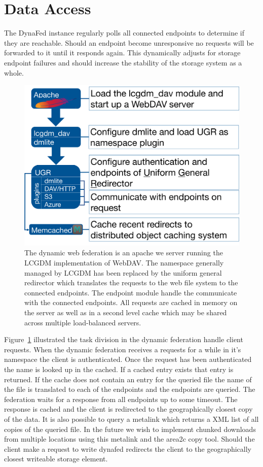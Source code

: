 \documentclass[a4paper]{jpconf}
\begin{document}
\section{Data Access}
The DynaFed instance regularly polls all connected endpoints to determine if they are reachable. Should an endpoint become unresponsive no requests will be forwarded to it until it responds again. This dynamically adjusts for storage endpoint failures and should increase the stability of the storage system as a whole.

\begin{figure}
  \centering
  \includegraphics[width=\textwidth]{dynafed-arch.png}
  \caption{The dynamic web federation is an apache we server running the LCGDM implementation of WebDAV. The namespace generally managed by LCGDM has been replaced by the uniform general redirector which translates the requests to the web file system to the connected endpoints. The endpoint module handle the communicate with the connected endpoints. All requests are cached in memory on the server as well as in a second level cache which may be shared across multiple load-balanced servers.}
  \label{fig:dynafed-arch}
\end{figure}

Figure~\ref{fig:dynafed-arch} illustrated the task division in the dynamic federation handle client requests. When the dynamic federation receives a requests for a while in it's namespace the client is authenticated. Once the request has been authenticated the name is looked up in the cached. If a cached entry exists that entry is returned. If the cache does not contain an entry for the queried file the name of the file is translated to each of the endpoints and the endpoints are queried. The federation waits for a response from all endpoints up to some timeout. The response is cached and the client is redirected to the geographically closest copy of the data. It is also possible to query a metalink which returns a XML list of all copies of the queried file. In the future we wish to implement chunked downloads from multiple locations using this metalink and the area2c copy tool. Should the client make a request to write dynafed redirects the client to the geographically closest writeable storage element.
\end{document}
